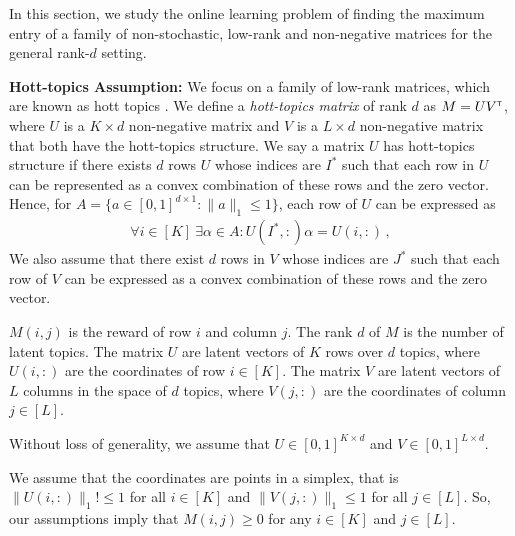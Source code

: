 
In this section, we study the online learning problem of finding the maximum entry of a family of non-stochastic, low-rank and non-negative matrices for the general rank-$d$ setting.  

\textbf{Hott-topics Assumption:} We focus on a family of low-rank matrices, which are known as hott topics \citep{recht2012factoring}. We define a \emph{hott-topics matrix} of rank $d$ as $M = U V^\mathsf{\scriptscriptstyle T}$, where $U$ is a $K \times d$ non-negative matrix and $V$ is a $L \times d$ non-negative matrix that both have the hott-topics structure. We say a matrix  $U$  has hott-topics structure if  there exists $d$ rows  $U$ whose indices are $I^\ast$ such that each row in $U$ can be represented as a convex combination of these rows  and the zero vector. Hence, for $A = \{a \in [0, 1]^{d \times 1}: \|a\|_1 \leq 1\}$, each row of $U$ can be expressed as
\begin{align}
  \forall i \in [K] \ \exists \alpha \in A: U(I^\ast, :) \alpha = U(i, :)\,,
  \label{eq:hott topics1}
\end{align}
We also assume that there exist $d$ rows in $V$ whose indices are $J^\ast$ such that each row of $V$ can be expressed as a convex combination of these rows  and the zero vector.

 $M(i, j)$ is the reward of row $i$ and column $j$. The rank $d$ of $M$ is the number of latent topics. The matrix $U$ are latent vectors of $K$ rows over $d$ topics, where $U(i, :)$ are the coordinates of row $i \in [K]$. The matrix $V$ are latent vectors of $L$ columns in the space of $d$ topics, where $V(j, :)$ are the coordinates of column $j \in [L]$. 

Without loss of generality, we assume that $U \in [0, 1]^{K \times d}$ and $V \in [0, 1]^{L \times d}$.

 We assume that the coordinates are points in a simplex, that is $\|U(i, :)\|_1 !\leq \!1$ for all $i \in [K]$ and $\|V(j, :)\|_1 \!\leq\! 1$ for all $j \in [L]$. So, our assumptions imply that $\!M(i, j) \!\geq\! 0$ for any $i \!\in \![K]$ and $j \!\in\! [L]$.

